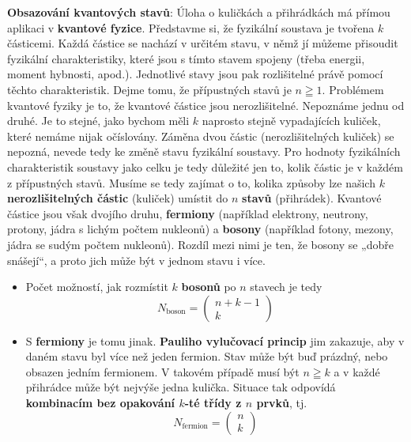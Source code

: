 \begin{example}\label{mai:exam010}
  \textbf{Obsazování kvantových stavů}:\newline\small
  Úloha o kuličkách a přihrádkách má přímou aplikaci v \textbf{kvantové fyzice}. Představme si, že 
  fyzikální soustava je tvořena \(k\) částicemi. Každá částice se nachází v určitém stavu, v němž 
  jí můžeme přisoudit fyzikální charakteristiky, které jsou s tímto stavem spojeny (třeba energii, 
  moment hybnosti, apod.). Jednotlivé stavy jsou pak rozlišitelné právě pomocí těchto 
  charakteristik. Dejme tomu, že přípustných stavů je \(n \geqq 1\). Problémem kvantové fyziky je 
  to, že kvantové částice jsou nerozlišitelné. Nepoznáme jednu od druhé. Je to stejné, jako bychom 
  měli \(k\) naprosto stejně vypadajících kuliček, které nemáme nijak očíslovány. Záměna dvou 
  částic (nerozlišitelných kuliček) se nepozná, nevede tedy ke změně stavu fyzikální soustavy. Pro 
  hodnoty fyzikálních charakteristik soustavy jako celku je tedy důležité jen to, kolik částic je v 
  každém z přípustných stavů. Musíme se tedy zajímat o to, kolika způsoby lze našich \(k\) 
  \textbf{nerozlišitelných částic} (kuliček) umístit do \(n\) \textbf{stavů} (přihrádek). Kvantové 
  částice jsou však dvojího druhu, \textbf{fermiony} (například elektrony, neutrony, protony, jádra 
  s lichým počtem nukleonů) a \textbf{bosony} (například fotony, mezony, jádra se sudým počtem 
  nukleonů). Rozdíl mezi nimi je ten, že bosony se „dobře snášejí“, a proto jich může být v jednom 
  stavu i více. 
  \begin{itemize}\addtolength{\itemsep}{-0.5\baselineskip}
    \item Počet možností, jak rozmístit \(k\) \textbf{bosonů} po \(n\) stavech je tedy
          \begin{equation*}
            N_{\text{boson}} = 
              \begin{pmatrix}
                n + k - 1 \\
                    k
               \end{pmatrix}
          \end{equation*}
    \item S \textbf{fermiony} je tomu jinak. \textbf{Pauliho vylučovací princip} jim zakazuje, 
          aby v daném stavu byl více než jeden fermion. Stav může být buď prázdný, nebo obsazen 
          jedním fermionem. V takovém případě musí být \(n \geqq k\) a v každé přihrádce může být 
          nejvýše jedna kulička. Situace tak odpovídá \textbf{kombinacím bez opakování \(k\)-té 
          třídy z \(n\) prvků}, tj.
          \begin{equation*}
            N_{\text{fermion}} = 
              \begin{pmatrix}
                n  \\
                k
              \end{pmatrix}
          \end{equation*}
  \end{itemize}
\normalsize
\end{example}
